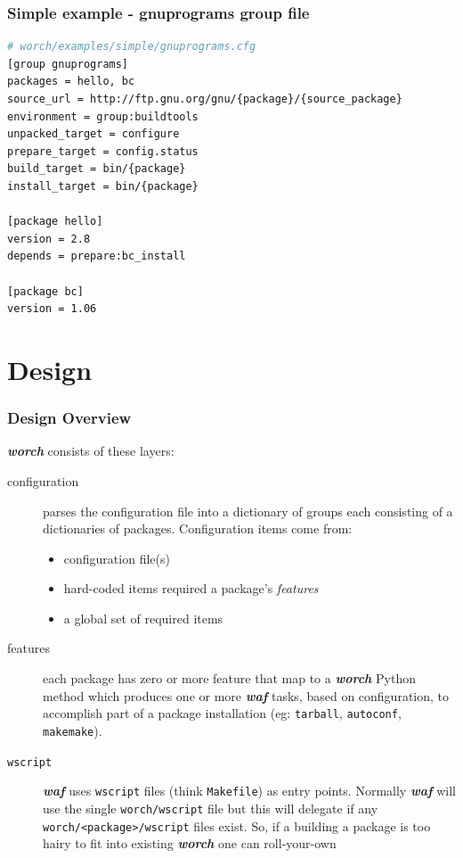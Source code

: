 \documentclass[xcolor=dvipsnames]{beamer}
\newcommand{\app}[1]{\textbf{\textit{#1}}\xspace}
\def\waf{\app{waf}}
\def\worch{\app{worch}}
\begin{document}
\begin{frame}[fragile]
  \frametitle{Simple example - gnuprograms group file}
    \begin{lstlisting}[language=bash,emph={start,keytype}]
# worch/examples/simple/gnuprograms.cfg
[group gnuprograms]
packages = hello, bc
source_url = http://ftp.gnu.org/gnu/{package}/{source_package}
environment = group:buildtools
unpacked_target = configure
prepare_target = config.status
build_target = bin/{package}
install_target = bin/{package}

[package hello]
version = 2.8
depends = prepare:bc_install

[package bc]
version = 1.06 
    \end{lstlisting}
\end{frame}

\section{Design}

\begin{frame}
\tableofcontents[
currentsection,currentsubsection,
hideothersubsections,sectionstyle=show/shaded,
] 
\end{frame}

\begin{frame}[fragile]
  \frametitle{Design Overview}
  \worch consists of these layers:
  \begin{description}
  \item[configuration] parses the configuration file into a dictionary
    of groups each consisting of a dictionaries of packages.
    Configuration items come from:
    \begin{itemize}
    \item configuration file(s) 
    \item hard-coded items required a package's \textit{features}
    \item a global set of required items
    \end{itemize}
  \item[features] each package has zero or more feature that map to a
    \worch Python method which produces one or more \waf tasks, based
    on configuration, to accomplish part of a package installation
    (eg: \texttt{tarball}, \texttt{autoconf}, \texttt{makemake}).
  \item[\texttt{wscript}] \waf uses \texttt{wscript} files (think
    \texttt{Makefile}) as entry points.  Normally \waf will use the
    single \texttt{worch/wscript} file but this will delegate if any
    \verb|worch/<package>/wscript| files exist.  So, if a building a
    package is too hairy to fit into existing \worch one can
    roll-your-own
  \end{description}
\end{frame}
\end{document}
